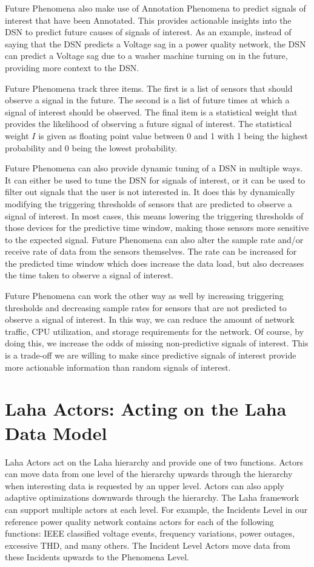 Future Phenomena also make use of Annotation Phenomena to predict signals of interest that have been Annotated. This provides actionable insights into the DSN to predict future causes of signals of interest. As an example, instead of saying that the DSN predicts a Voltage sag in a power quality network, the DSN can predict a Voltage sag due to a washer machine turning on in the future, providing more context to the DSN\@.

Future Phenomena track three items. The first is a list of sensors that should observe a signal in the future. The second is a list of future times at which a signal of interest should be observed. The final item is a statistical weight that provides the likelihood of observing a future signal of interest. The statistical weight $I$ is given as floating point value between 0 and 1 with 1 being the highest probability and 0 being the lowest probability.

Future Phenomena can also provide dynamic tuning of a DSN in multiple ways. It can either be used to tune the DSN for signals of interest, or it can be used to filter out signals that the user is not interested in. It does this by dynamically modifying the triggering thresholds of sensors that are predicted to observe a signal of interest. In most cases, this means lowering the triggering thresholds of those devices for the predictive time window, making those sensors more sensitive to the expected signal. Future Phenomena can also alter the sample rate and/or receive rate of data from the sensors themselves. The rate can be increased for the predicted time window which does increase the data load, but also decreases the time taken to observe a signal of interest.

Future Phenomena can work the other way as well by increasing triggering thresholds and decreasing sample rates for sensors that are not predicted to observe a signal of interest. In this way, we can reduce the amount of network traffic, CPU utilization, and storage requirements for the network. Of course, by doing this, we increase the odds of missing non-predictive signals of interest. This is a trade-off we are willing to make since predictive signals of interest provide more actionable information than random signals of interest.


\section{Laha Actors: Acting on the Laha Data Model}\label{sec:laha-actors:-acting-on-the-laha-data-model}
Laha Actors act on the Laha hierarchy and provide one of two functions. Actors can move data from one level of the hierarchy upwards through the hierarchy when interesting data is requested by an upper level. Actors can also apply adaptive optimizations downwards through the hierarchy. The Laha framework can support multiple actors at each level. For example, the Incidents Level in our reference power quality network contains actors for each of the following functions: IEEE classified voltage events, frequency variations, power outages, excessive THD, and many others. The Incident Level Actors move data from these Incidents upwards to the Phenomena Level.

